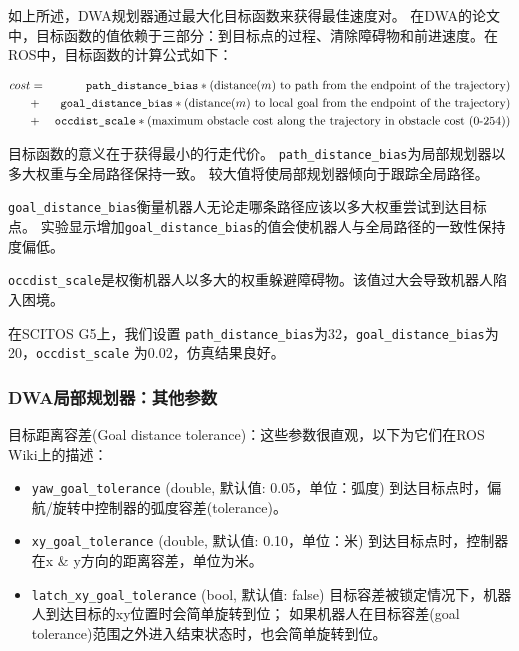如上所述，DWA规划器通过最大化目标函数来获得最佳速度对。
在DWA的论文中，目标函数的值依赖于三部分：到目标点的过程、清除障碍物和前进速度。在ROS中，目标函数的计算公式如下：

\begin{eqnarray*}\footnotesize
	cost &=& \texttt{path\_distance\_bias} * (\text{distance($m$) to path from the endpoint of the trajectory})\\
	&+& \texttt{goal\_distance\_bias} * (\text{distance($m$) to local goal from the endpoint of the trajectory})\\
	&+& \texttt{occdist\_scale} * (\text{maximum obstacle cost along the trajectory in obstacle cost (0-254)})
\end{eqnarray*}

目标函数的意义在于获得最小的行走代价。
\texttt{path_distance_bias}为局部规划器以多大权重与全局路径保持一致\cite{furrer2016robot}。
较大值将使局部规划器倾向于跟踪全局路径。

\texttt{goal_distance_bias}衡量机器人无论走哪条路径应该以多大权重尝试到达目标点。
实验显示增加\texttt{goal_distance_bias}的值会使机器人与全局路径的一致性保持度偏低。

\texttt{occdist_scale}是权衡机器人以多大的权重躲避障碍物。该值过大会导致机器人陷入困境。

在SCITOS G5上，我们设置 \texttt{path_distance_bias}为32，\texttt{goal_distance_bias}为20，\texttt{occdist_scale} 为0.02，仿真结果良好。

\subsubsection[DWA Local Planner: Other Parameters]{DWA局部规划器：其他参数}%

目标距离容差(Goal distance tolerance)：这些参数很直观，以下为它们在ROS Wiki上的描述：

\begin{itemize}
	\item \texttt{yaw_goal_tolerance} (double, 默认值: 0.05，单位：弧度)
	到达目标点时，偏航/旋转中控制器的弧度容差(tolerance)。
	
	\item \texttt{xy_goal_tolerance} (double, 默认值: 0.10，单位：米)
	到达目标点时，控制器在x \& y方向的距离容差，单位为米。
	
	\item \texttt{latch_xy_goal_tolerance} (bool, 默认值: false) 
	目标容差被锁定情况下，机器人到达目标的xy位置时会简单旋转到位；
	如果机器人在目标容差(goal tolerance)范围之外进入结束状态时，也会简单旋转到位。
	
\end{itemize}

